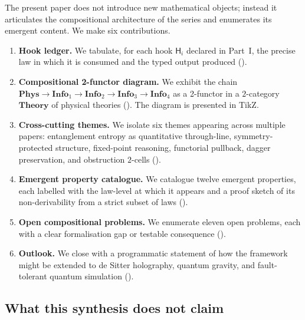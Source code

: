 \documentclass[12pt]{article}
\theoremstyle{definition}
\theoremstyle{remark}
\newcommand{\Phys}{\mathbf{Phys}}
\newcommand{\Info}{\mathbf{Info}}
\newcommand{\Theory}{\mathbf{Theory}}
\begin{document}
The present paper does not introduce new mathematical objects; instead it
articulates the compositional architecture of the series and enumerates its
emergent content. We make six contributions.

\begin{enumerate}
  \item \textbf{Hook ledger.} We tabulate, for each hook $\mathsf{H}_i$
    declared in Part~I, the precise law in which it is consumed and the
    typed output produced ().
  \item \textbf{Compositional 2-functor diagram.} We exhibit the chain
    $\Phys \to \Info_1 \to \Info_2 \to \Info_3 \to \Info_4$ as a 2-functor in
    a $2$-category $\Theory$ of physical theories
    (). The diagram is presented in TikZ.
  \item \textbf{Cross-cutting themes.} We isolate six themes appearing across
    multiple papers: entanglement entropy as quantitative through-line,
    symmetry-protected structure, fixed-point reasoning, functorial pullback,
    dagger preservation, and obstruction $2$-cells ().
  \item \textbf{Emergent property catalogue.} We catalogue twelve
    emergent properties, each labelled with the law-level at which it appears
    and a proof sketch of its non-derivability from a strict subset of laws
    ().
  \item \textbf{Open compositional problems.} We enumerate eleven open
    problems, each with a clear formalisation gap or testable consequence
    ().
  \item \textbf{Outlook.} We close with a programmatic statement of how the
    framework might be extended to de Sitter holography, quantum gravity, and
    fault-tolerant quantum simulation ().
\end{enumerate}

\subsection{What this synthesis does not claim}
\end{document}
